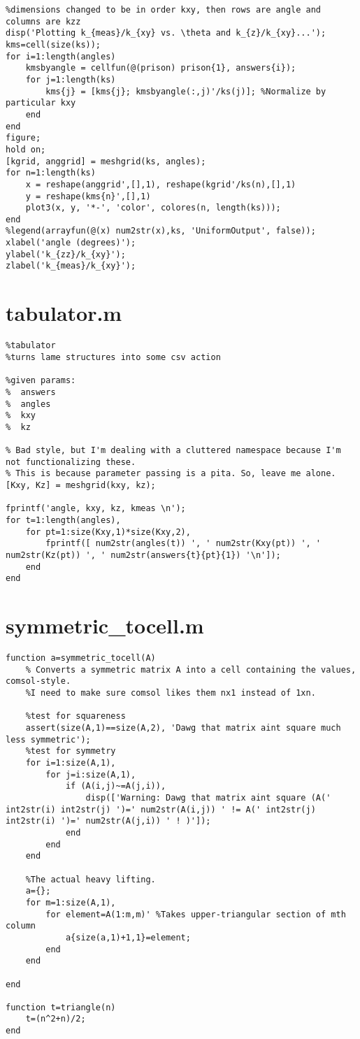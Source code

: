 \begin{verbatim}
%dimensions changed to be in order kxy, then rows are angle and columns are kzz
disp('Plotting k_{meas}/k_{xy} vs. \theta and k_{z}/k_{xy}...');
kms=cell(size(ks));
for i=1:length(angles)
    kmsbyangle = cellfun(@(prison) prison{1}, answers{i});
    for j=1:length(ks)
        kms{j} = [kms{j}; kmsbyangle(:,j)'/ks(j)]; %Normalize by particular kxy
    end
end
figure;
hold on;
[kgrid, anggrid] = meshgrid(ks, angles);
for n=1:length(ks)
    x = reshape(anggrid',[],1), reshape(kgrid'/ks(n),[],1)
    y = reshape(kms{n}',[],1)
    plot3(x, y, '*-', 'color', colores(n, length(ks)));
end
%legend(arrayfun(@(x) num2str(x),ks, 'UniformOutput', false));
xlabel('angle (degrees)');
ylabel('k_{zz}/k_{xy}');
zlabel('k_{meas}/k_{xy}');
\end{verbatim}
\normalsize

\section{tabulator.m}
\small
\begin{verbatim}
%tabulator
%turns lame structures into some csv action

%given params:
%  answers
%  angles
%  kxy
%  kz

% Bad style, but I'm dealing with a cluttered namespace because I'm not functionalizing these.
% This is because parameter passing is a pita. So, leave me alone.
[Kxy, Kz] = meshgrid(kxy, kz);

fprintf('angle, kxy, kz, kmeas \n');
for t=1:length(angles),
    for pt=1:size(Kxy,1)*size(Kxy,2),
        fprintf([ num2str(angles(t)) ', ' num2str(Kxy(pt)) ', ' num2str(Kz(pt)) ', ' num2str(answers{t}{pt}{1}) '\n']);
    end
end
\end{verbatim}
\normalsize

\section{symmetric\_tocell.m}
\small
\begin{verbatim}
function a=symmetric_tocell(A)
    % Converts a symmetric matrix A into a cell containing the values, comsol-style.
    %I need to make sure comsol likes them nx1 instead of 1xn.

    %test for squareness
    assert(size(A,1)==size(A,2), 'Dawg that matrix aint square much less symmetric');
    %test for symmetry
    for i=1:size(A,1),
        for j=i:size(A,1),
            if (A(i,j)~=A(j,i)),
                disp(['Warning: Dawg that matrix aint square (A(' int2str(i) int2str(j) ')=' num2str(A(i,j)) ' != A(' int2str(j) int2str(i) ')=' num2str(A(j,i)) ' ! )']);
            end
        end
    end

    %The actual heavy lifting.
    a={};
    for m=1:size(A,1),
        for element=A(1:m,m)' %Takes upper-triangular section of mth column
            a{size(a,1)+1,1}=element;
        end
    end

end

function t=triangle(n)
    t=(n^2+n)/2;
end
\end{verbatim}
\normalsize

